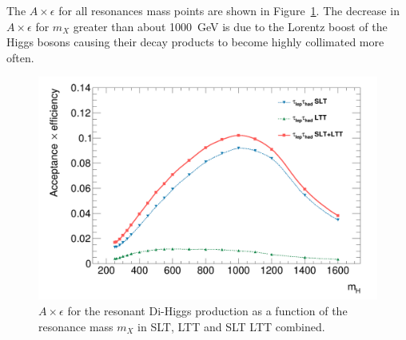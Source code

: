 The $A \times \epsilon$ for all resonances mass points are shown 
in Figure~\ref{fig:selection:acceptances}. 
The decrease in $A \times \epsilon$ 
for $m_X$ greater than about 1000~GeV is due to the Lorentz boost 
of the Higgs bosons causing their decay products to become highly collimated more often.

\begin{figure}[htbp]
\centering
\includegraphics[width=0.85\linewidth]{DiHiggs/plots/FF_CRs/testacc.png}
\caption{$A \times \epsilon$ for the resonant Di-Higgs production
as a function of the resonance mass $m_X$ in
SLT, LTT and SLT LTT combined.}
\label{fig:selection:acceptances}
\end{figure}

